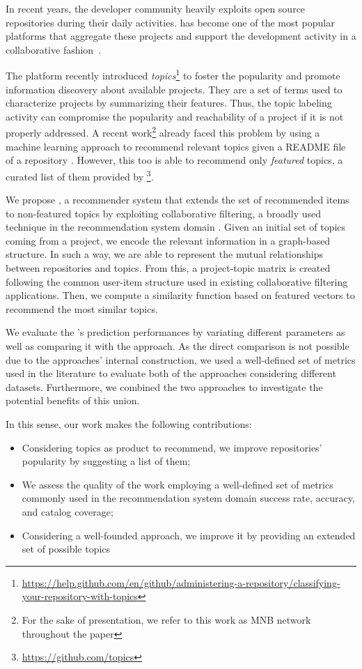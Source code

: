 In recent years, the developer community heavily exploits open source repositories during their daily activities. \GH has become one of the most
popular platforms that aggregate these projects and
support the development activity in a collaborative fashion~\cite{7832894}.
%

The platform recently introduced \emph{topics}\footnote{\url{https://help.github.com/en/github/administering-a-repository/classifying-your-repository-with-topics}} to foster the popularity and promote information discovery about available projects. They are a set of terms used to characterize projects by summarizing their features.  
Thus, the topic labeling activity can compromise the popularity and reachability of a project if it is not properly addressed. A recent work\footnote{For the sake of presentation, we refer to this work as MNB network throughout the paper} already faced this problem by using a machine learning approach to recommend relevant topics given a README file of a repository \cite{10.1145/3383219.3383227}. However, this too is able to recommend only \emph{featured} topics, a curated list of them provided by \GH\footnote{\url{https://github.com/topics}}.

 
We propose \CT, a recommender system that extends the set of recommended items to non-featured topics by exploiting collaborative filtering, a broadly used technique in the recommendation system domain \cite{Schafer:2007:CFR:1768197.1768208}. Given an initial set of topics coming from a \GH project, we encode the relevant information in a graph-based structure. In such a way, we are able to represent the mutual relationships between repositories and topics. From this, a project-topic matrix is created following the common user-item structure used in existing collaborative filtering applications. Then, we compute a similarity function based on featured vectors to recommend the most similar topics.

We evaluate the \CT's prediction performances by variating different parameters as well as comparing it with the \MNB approach. As the direct comparison is not possible due to the approaches' internal construction, we used a well-defined set of metrics used in the literature to evaluate both of the approaches considering different datasets. Furthermore, we combined the two approaches to investigate the potential benefits of this union. 

In this sense, our work makes the following contributions:
\begin{itemize}
\item Considering \GH topics as product to recommend, we improve repositories' popularity by suggesting a list of them;
\item We assess the quality of the work employing a well-defined set of metrics commonly used in the recommendation system domain \ie success rate, accuracy, and catalog coverage;
\item Considering a well-founded approach, we improve it by providing an extended set of possible topics  
\end{itemize}

